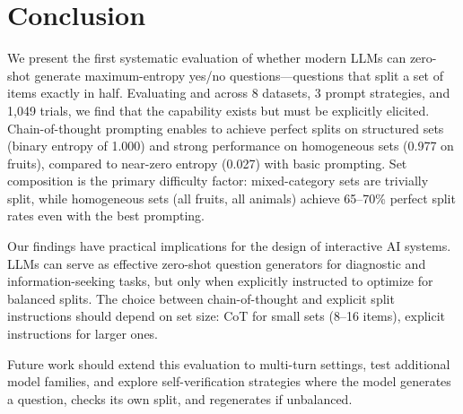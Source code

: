 \section{Conclusion}
\label{sec:conclusion}

We present the first systematic evaluation of whether modern LLMs can zero-shot generate maximum-entropy yes/no questions---questions that split a set of items exactly in half.
Evaluating \gptfull and \gptmini across 8 datasets, 3 prompt strategies, and 1,049 trials, we find that the capability exists but must be explicitly elicited.
Chain-of-thought prompting enables \gptfull to achieve perfect splits on structured sets (binary entropy of 1.000) and strong performance on homogeneous sets (0.977 on fruits), compared to near-zero entropy (0.027) with basic prompting.
Set composition is the primary difficulty factor: mixed-category sets are trivially split, while homogeneous sets (all fruits, all animals) achieve 65--70\% perfect split rates even with the best prompting.

Our findings have practical implications for the design of interactive AI systems.
LLMs can serve as effective zero-shot question generators for diagnostic and information-seeking tasks, but only when explicitly instructed to optimize for balanced splits.
The choice between chain-of-thought and explicit split instructions should depend on set size: CoT for small sets (8--16 items), explicit instructions for larger ones.

Future work should extend this evaluation to multi-turn settings, test additional model families, and explore self-verification strategies where the model generates a question, checks its own split, and regenerates if unbalanced.
